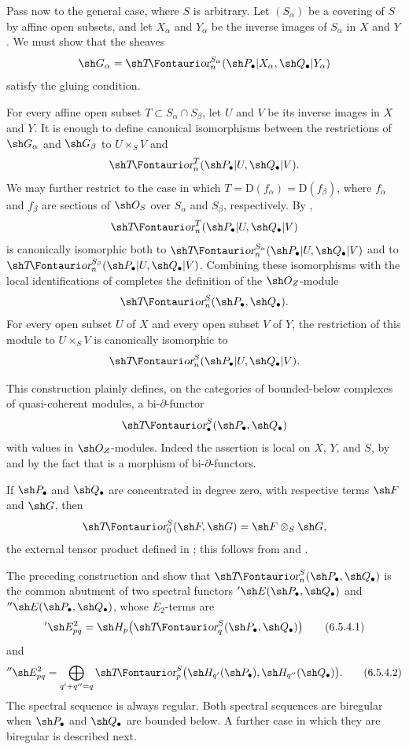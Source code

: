 \begin{env}[6.5.3]
\label{III.6.5.3}
Pass now to the general case, where $S$ is arbitrary.  Let
$(S_\alpha)$ be a covering of $S$ by affine open subsets, and let
$X_\alpha$ and $Y_\alpha$ be the inverse images of $S_\alpha$ in
$X$ and $Y$.  We must show that the sheaves
\[
  \sh G_\alpha
  =
  \shTor_n^{S_\alpha}
  (\sh P_\bullet|X_\alpha,\sh Q_\bullet|Y_\alpha)
\]
satisfy the gluing condition.

For every affine open subset
$T\subset S_\alpha\cap S_\beta$, let $U$ and $V$ be its inverse
images in $X$ and $Y$.  It is enough to define canonical
isomorphisms between the restrictions of $\sh G_\alpha$ and
$\sh G_\beta$ to $U\times_SV$ and
\[
  \shTor_n^T(\sh P_\bullet|U,\sh Q_\bullet|V).
\]
We may further restrict to the case in which
$T=\mathrm D(f_\alpha)=\mathrm D(f_\beta)$, where $f_\alpha$ and
$f_\beta$ are sections of $\sh O_S$ over $S_\alpha$ and
$S_\beta$, respectively.  By ,
\[
  \shTor_n^T(\sh P_\bullet|U,\sh Q_\bullet|V)
\]
is canonically isomorphic both to
$\shTor_n^{S_\alpha}(\sh P_\bullet|U,\sh Q_\bullet|V)$ and to
$\shTor_n^{S_\beta}(\sh P_\bullet|U,\sh Q_\bullet|V)$.
Combining these isomorphisms with the local identifications of
 completes the definition of the
$\sh O_Z$-module
\[
  \shTor_n^S(\sh P_\bullet,\sh Q_\bullet).
\]
For every open subset $U$ of $X$ and every open subset $V$ of
$Y$, the restriction of this module to $U\times_SV$ is
canonically isomorphic to
\[
  \shTor_n^S(\sh P_\bullet|U,\sh Q_\bullet|V).
\]

This construction plainly defines, on the categories of
bounded-below complexes of quasi-coherent modules, a
bi-$\partial$-functor
\[
  \shTor_\bullet^S(\sh P_\bullet,\sh Q_\bullet)
\]
with values in $\sh O_Z$-modules.  Indeed the assertion is local
on $X$, $Y$, and $S$, by  and by the fact that
 is a morphism of bi-$\partial$-functors.

If $\sh P_\bullet$ and $\sh Q_\bullet$ are concentrated in degree
zero, with respective terms $\sh F$ and $\sh G$, then
\[
  \shTor_0^S(\sh F,\sh G)
  =
  \sh F\otimes_S\sh G,
\]
the external tensor product defined in ; this
follows from  and .
\end{env}

\begin{env}[6.5.4]
\label{III.6.5.4}
The preceding construction and  show that
$\shTor_n^S(\sh P_\bullet,\sh Q_\bullet)$ is the common abutment
of two spectral functors
$'\sh E(\sh P_\bullet,\sh Q_\bullet)$ and
$''\sh E(\sh P_\bullet,\sh Q_\bullet)$, whose $E_2$-terms are
\[
  '\sh E_{pq}^2
  =
  \sh H_p\bigl(\shTor_q^S(\sh P_\bullet,\sh Q_\bullet)\bigr)
  \tag{6.5.4.1}\label{III.6.5.4.1}
\]
and
\[
  ''\sh E_{pq}^2
  =
  \bigoplus_{q'+q''=q}
  \shTor_p^S
  \bigl(\sh H_{q'}(\sh P_\bullet),
        \sh H_{q''}(\sh Q_\bullet)\bigr).
  \tag{6.5.4.2}\label{III.6.5.4.2}
\]
The spectral sequence  is always regular.  Both
spectral sequences are biregular when $\sh P_\bullet$ and
$\sh Q_\bullet$ are bounded below.  A further case in which they
are biregular is described next.
\end{env}

